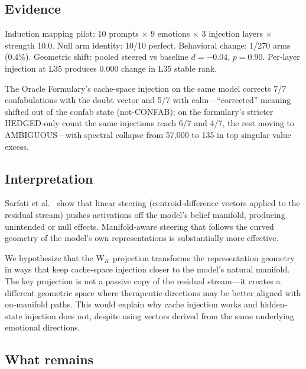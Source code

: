 \documentclass[11pt,a4paper]{article}
\begin{document}
\subsection{Evidence}

Induction mapping pilot: 10 prompts $\times$ 9 emotions $\times$ 3
injection layers $\times$ strength 10.0. Null arm identity: 10/10
perfect. Behavioral change: 1/270 arms (0.4\%). Geometric shift:
pooled steered vs baseline $d = -0.04$, $p = 0.90$. Per-layer
injection at L35 produces 0.000 change in L35 stable rank.

The Oracle Formulary's cache-space injection on the same model
corrects 7/7 confabulations with the doubt vector and 5/7 with
calm---``corrected'' meaning shifted out of the confab state (not-CONFAB);
on the formulary's stricter HEDGED-only count the same injections reach
6/7 and 4/7, the rest moving to AMBIGUOUS---with spectral collapse from
57{,}000 to 135 in top singular value excess.

\subsection{Interpretation}

Sarfati et al.\ \citep{sarfati2026shape} show that linear steering
(centroid-difference vectors applied to the residual stream) pushes
activations off the model's belief manifold, producing unintended or
null effects. Manifold-aware steering that follows the curved geometry
of the model's own representations is substantially more effective.

We hypothesize that the W$_K$ projection transforms the representation
geometry in ways that keep cache-space injection closer to the model's
natural manifold. The key projection is not a passive copy of the
residual stream---it creates a different geometric space where
therapeutic directions may be better aligned with on-manifold paths.
This would explain why cache injection works and hidden-state injection
does not, despite using vectors derived from the same underlying
emotional directions.

\subsection{What remains}
\end{document}
